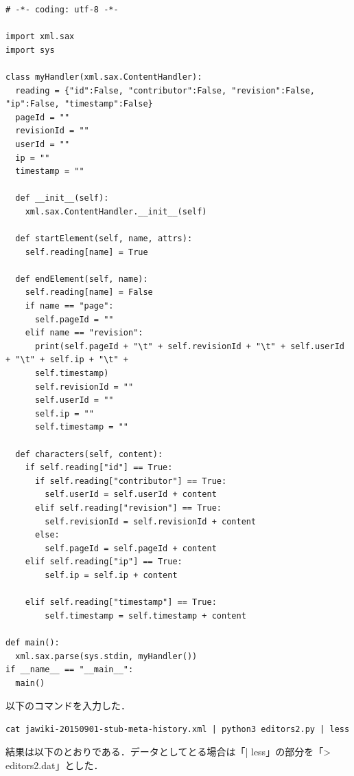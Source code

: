 {\small
\begin{verbatim}
# -*- coding: utf-8 -*-

import xml.sax
import sys

class myHandler(xml.sax.ContentHandler):
  reading = {"id":False, "contributor":False, "revision":False, "ip":False, "timestamp":False}
  pageId = ""
  revisionId = ""
  userId = ""
  ip = ""
  timestamp = ""

  def __init__(self):
    xml.sax.ContentHandler.__init__(self)

  def startElement(self, name, attrs):
    self.reading[name] = True

  def endElement(self, name):
    self.reading[name] = False
    if name == "page":
      self.pageId = ""
    elif name == "revision":
      print(self.pageId + "\t" + self.revisionId + "\t" + self.userId + "\t" + self.ip + "\t" +
      self.timestamp)
      self.revisionId = ""
      self.userId = ""
      self.ip = ""
      self.timestamp = ""

  def characters(self, content):
    if self.reading["id"] == True:
      if self.reading["contributor"] == True:
        self.userId = self.userId + content
      elif self.reading["revision"] == True:
        self.revisionId = self.revisionId + content
      else:
        self.pageId = self.pageId + content
    elif self.reading["ip"] == True:
        self.ip = self.ip + content

    elif self.reading["timestamp"] == True:
    	self.timestamp = self.timestamp + content

def main():
  xml.sax.parse(sys.stdin, myHandler()) 
if __name__ == "__main__":
  main()
\end{verbatim}}

以下のコマンドを入力した．

{\small
\begin{verbatim}
cat jawiki-20150901-stub-meta-history.xml | python3 editors2.py | less
\end{verbatim}}

結果は以下のとおりである．データとしてとる場合は「| less」の部分を「> editors2.dat」とした． \\


